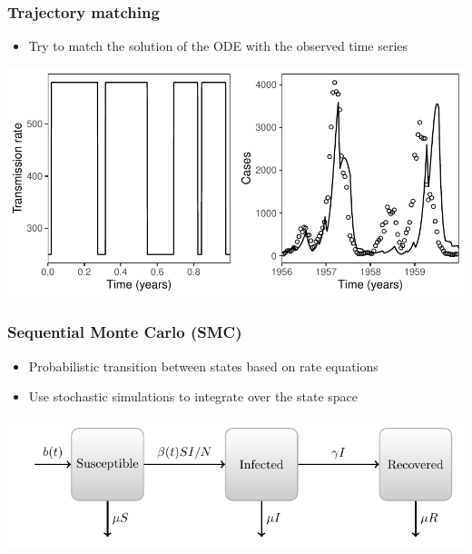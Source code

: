 \documentclass{beamer}
\begin{document}
\begin{frame}
\frametitle{Trajectory matching}
\begin{itemize}
	\item Try to match the solution of the ODE with the observed time series
\end{itemize}
\begin{center}
\includegraphics[width=\textwidth]{traj3.pdf}
\end{center}
\end{frame}

\begin{frame}
\frametitle{Sequential Monte Carlo (SMC)}
\begin{itemize}
	\item Probabilistic transition between states based on rate equations
	\item Use stochastic simulations to integrate over the state space \citep{king2015statistical}
\end{itemize}
\begin{center}
\includegraphics[width=\textwidth]{model_diagram.pdf}
\end{center}
\end{frame}
\end{document}
